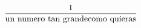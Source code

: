 \documentclass[preview]{standalone}
\begin{document}
\begin{align*}
\frac{1}{\text{un numero tan grande \newline como quieras}}
\end{align*}
\end{document}
